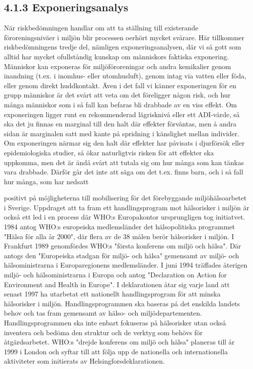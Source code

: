 \subsection*{4.1.3 Exponeringsanalys}
När riskbedömningen handlar om att ta ställning till existerande föroreningsniväer i miljön blir processen oerhört mycket svårare. Här tillkommer riskbedömningens tredje del, nämligen exponeringsanalysen, där vi så gott som alltid har mycket ofullståndig kunskap om människors faktiska exponering. Människor kan exponeras för miljöföroreningar och andra kemikalier genom inandning (t.ex. i inomhus- eller utomhusluft), genom intag via vatten eller föda, eller genom direkt huddkontakt. Även i det fall vi känner exponeringen för en grupp människor är det svårt att veta om det föreligger någon risk, och hur många människor som i så fall kan befaras bli drabbade av en viss effekt. Om exponeringen ligger runt en rekommenderad lägrisknivå eller ett ADI-värde, så ska det ju finnas en marginal till den halt där effekter förväntas, men å andra sidan är marginalen satt med kante på spridning i känslighet mellan individer. Om exponeringen närmar sig den halt där effekter har påvisats i djurförsök eller epidemiologiska studier, så ökar naturligtvis risken för att effekter ska uppkomma, men det är ändå svårt att tutala sig om hur många som kan tänkas vara drabbade. Därför går det inte att säga om det t.ex. finns barn, och i så fall hur många, som har nedsatt

positivt på möjligheterna till mobilisering för det förebyggande miljöhälsoarbetet i Sverige.
Uppdraget att ta fram ett handlingsprogram mot hälsorisker i miljön är också ett led i en process där WHO:s Europakontor ursprungligen tog initiatvet. 1984 antog WHO:s europeiska medlemsländer det hälsopolitiska programmet "Hälsa för alla år 2000", där flera av de 38 målen berör hälsorisker i miljön. I Frankfurt 1989 genomfördes WHO:s "första konferens om miljö och hälsa". Där antogs den "Europeiska stadgan för miljö- och hälsa" gemensamt av miljö- och hälsoministrarna i Europaregionens medlemsländer.
I juni 1994 träffades återigen miljö- och hälsoministrarna i Europa och antog "Declaration on Action for Environment and Health in Europe". I deklarationen åtar sig varje land att senast 1997 ha utarbetat ett nationellt handlingsprogram för att minska hälsorisker i miljön. Handlingsprogrammen ska baseras på det enskilda landets behov och tas fram gemensamt av hälso- och miljödepartementen. Handlingsprogrammen ska inte enbart fokuseras på hälsorisker utan också inventera och bedöma den struktur och de verktyg som behövs för åtgärdsarbetet.
WHO:s "drejde konferens om miljö och hälsa" planeras till år 1999 i London och syftar till att följa upp de nationella och internationella aktiviteter som initierats av Helsingforsdeklarationen.
